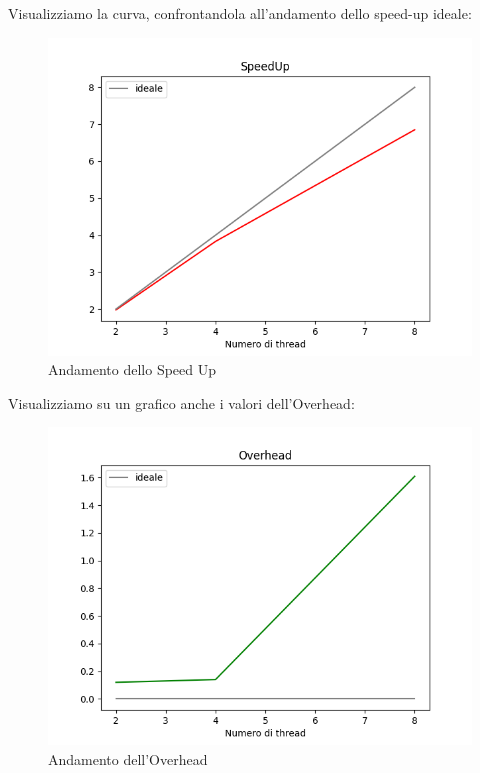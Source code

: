 \newpage
Visualizziamo la curva, confrontandola all'andamento dello speed-up ideale:
\begin{figure}[h!tbp]
    \centering
    \includegraphics[width=1\linewidth]{SpeedUp.png}
    \caption{Andamento dello Speed Up}
    \label{fig:enter-label}
\end{figure}
\clearpage
Visualizziamo su un grafico anche i valori dell'Overhead:

\begin{figure}[h!tbp]
    \centering
    \includegraphics[width=1\linewidth]{Overhead.png}
    \caption{Andamento dell'Overhead}
    \label{fig:enter-label}
\end{figure}

